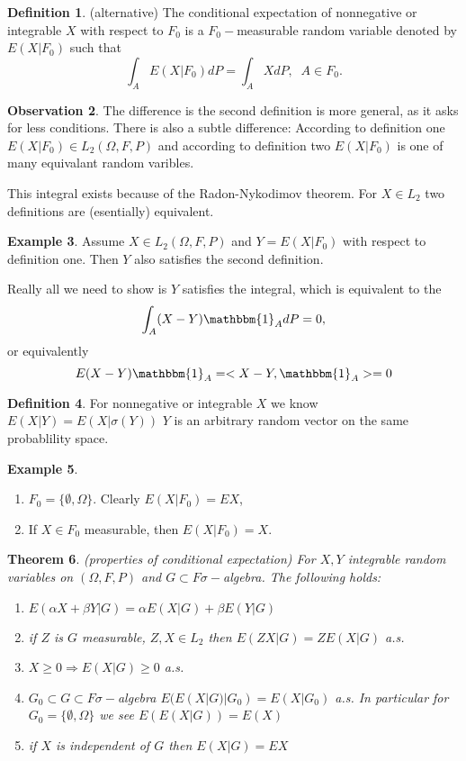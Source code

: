 \documentclass[12pt,a4paper]{amsart}
\theoremstyle{definition} %
\newtheorem{defn}{Definition}[section]
\newtheorem{example}[defn]{Example}
\newtheorem{observation}[defn]{Observation}
\theoremstyle{plain} %
\newtheorem{theorem}[defn]{Theorem}
\begin{document}
\begin{defn} (alternative)
The conditional expectation of nonnegative or integrable $X$ with respect to $F_0$ is a $F_0-$measurable random variable denoted by $E(X | F_0)$ such that 
$$\int_A E(X | F_0) dP = \int_A X dP, \;\;A \in F_0.$$
\end{defn}

\begin{observation}
The difference is the second definition is more general, as it asks for less conditions. There is also a subtle difference:
According to definition one
$E(X | F_0) \in  L_2(\Omega, F, P)$ and according to definition two 
$E(X | F_0)$ is one of many equivalant random varibles. 

This integral exists because of the Radon-Nykodimov theorem. For $X \in L_2$ two definitions are (esentially) equivalent.
\end{observation}

\begin{example}
Assume $X \in  L_2(\Omega, F, P)$ and $Y = E(X |F_0)$ with respect to definition one. Then $Y$ also satisfies the second definition.

Really all we need to show  is $Y$ satisfies the integral, which is equivalent to the 
$$\int_A(X-Y)\mathbbm{1}_A dP = 0,$$
or equivalently
$$E(X - Y) \mathbbm{1}_A = <X-Y, \mathbbm{1}_A> = 0$$
\end{example}

\begin{defn}
For nonnegative or integrable $X$ we know
$E(X | Y ) = E(X | \sigma(Y))$
$Y$ is an arbitrary random vector on the same probablility space. 
\end{defn}


\begin{example}
\begin{enumerate}
\item $F_0 = \{\emptyset, \Omega\}$. Clearly $E(X | F_0) = EX$,
\item If $X \in F_0$ measurable, then $E(X | F_0) = X$.
\end{enumerate}
\end{example}

\begin{theorem} (properties of conditional expectation)
For $X,Y$ integrable random variables on $(\Omega, F, P)$ and $G \subset F \sigma-$algebra. The following holds:
\begin{enumerate}
\item $E(\alpha X + \beta Y | G) = \alpha E(X | G) + \beta E(Y | G)$
\item if $Z$ is $G$ measurable, $Z, X \in L_2$ then 
$E(ZX|G) = Z E(X|G)$ a.s.
\item $X \geq 0 \Rightarrow E(X | G) \geq 0$ a.s.
\item  $G_0 \subset G \subset F \sigma-$algebra
$E(E(X|G)|G_0) = E(X|G_0)$ a.s.
In particular for $G_0 = \{\emptyset, \Omega\}$ we see
$E(E(X|G)) = E(X)$
\item if $X$ is independent of $G$ then
$E(X | G) = EX$
\end{enumerate}
\end{theorem}
\end{document}
